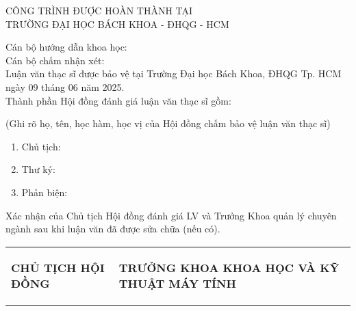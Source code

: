 \begin{boxA}
\begin{titlepage}
\begin{center}
    CÔNG TRÌNH ĐƯỢC HOÀN THÀNH TẠI\\
    TRƯỜNG ĐẠI HỌC BÁCH KHOA - ĐHQG - HCM
\end{center}

Cán bộ hướng dẫn khoa học:
\\

Cán bộ chấm nhận xét: 
\\

Luận văn thạc sĩ được bảo vệ tại Trường Đại học Bách Khoa, ĐHQG Tp. HCM ngày 09 tháng 06 năm 2025.
\\

Thành phần Hội đồng đánh giá luận văn thạc sĩ gồm:

(Ghi rõ họ, tên, học hàm, học vị của Hội đồng chấm bảo vệ luận văn thạc sĩ)
\begin{enumerate}
    \item Chủ tịch: 
    \item Thư ký: 
    \item Phản biện: 
\end{enumerate}

Xác nhận của Chủ tịch Hội đồng đánh giá LV và Trưởng Khoa quản lý chuyên ngành sau khi luận văn đã được sửa chữa (nếu có).

\vspace{1em}
\begin{tabular}
{p{} p{}}
     \begin{center}
         \textbf{CHỦ TỊCH HỘI ĐỒNG}
     \end{center}& \begin{center}
         \textbf{TRƯỞNG KHOA KHOA HỌC VÀ KỸ THUẬT MÁY TÍNH}
     \end{center}   \\
\end{tabular}
\end{titlepage}
\end{boxA}